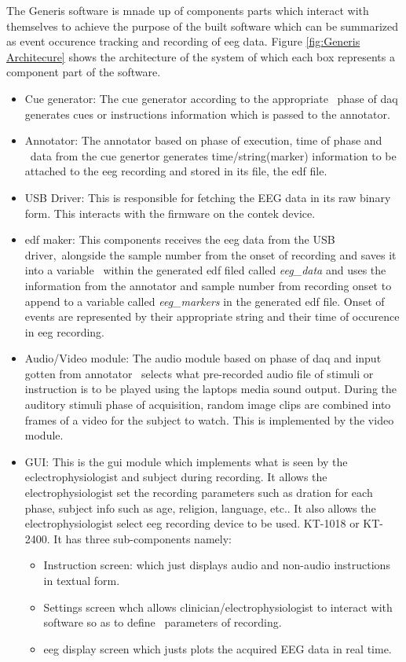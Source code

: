 \documentclass[10pt]{article}
\begin{document}
The Generis software is mnade up of components parts which interact with 
themselves to achieve the purpose of the built software which can be 
summarized as event occurence tracking and recording of \gls{eeg} data. 
Figure \ref{fig:Generis Architecure} shows the architecture of the system of which each box represents 
a component part of the software.
\begin{itemize}
  \item Cue generator: The cue generator according to the appropriate \
  phase of \gls{daq} generates cues or instructions information which is passed 
  to the annotator.
  \item Annotator: The annotator based on phase of execution, time of phase and \
  data from the cue genertor generates time/string(marker) information to be attached to 
  the \gls{eeg} recording and stored in its file, the \Gls{edf} file.
  \item USB Driver: This is responsible for fetching the EEG data in its raw
  binary form. This interacts with the firmware on the contek device.
  \item edf maker: This components receives the \gls{eeg} data from the USB driver,\ 
  alongside the sample number from the onset of recording and saves it into a variable \ 
  within the generated \gls{edf} filed called \textit{eeg\_data} and uses the information from 
  the annotator and sample number from recording onset to append to a variable called \textit{eeg\_markers} 
  in the generated \gls{edf} file. Onset of events are represented by their appropriate string and their time of occurence 
  in \gls{eeg} recording. 
  \item Audio/Video module: The audio module based on phase of \gls{daq} and input gotten from annotator \
  selects what pre-recorded audio file of stimuli or instruction is to be played using the laptops media sound 
  output. During the auditory stimuli phase of acquisition, random image clips are combined into frames of a 
  video for the subject to watch. This is implemented by the video module.
  \item GUI: This is the \Gls{gui} module which implements what is seen by the eclectrophysiologist and 
  subject during recording. It allows the electrophysiologist set the recording parameters such as dration 
  for each phase, subject info such as age, religion, language, etc.. It also allows the electrophysiologist 
  select \gls{eeg} recording device to be used. KT-1018 or KT-2400. It has three sub-components namely:
  \begin{itemize}
    \item Instruction screen: which just displays audio  and non-audio instructions in textual form.
    \item Settings screen whch allows clinician/electrophysiologist to interact with software so as to define \
    parameters of recording.
    \item \gls{eeg} display screen which justs plots the acquired EEG data in real time. 
  \end{itemize}
\end{itemize}
\end{document}
